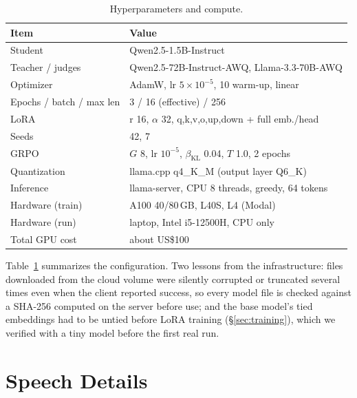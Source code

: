 \begin{table}[t]
\centering\footnotesize
\begin{tabular}{@{}lp{4.1cm}@{}}
\toprule
Item & Value \\
\midrule
Student & Qwen2.5-1.5B-Instruct \\
Teacher / judges & Qwen2.5-72B-Instruct-AWQ, Llama-3.3-70B-AWQ \\
Optimizer & AdamW, lr $5\times10^{-5}$, 10 warm-up, linear \\
Epochs / batch / max len & 3 / 16 (effective) / 256 \\
LoRA & r 16, $\alpha$ 32, q,k,v,o,up,down + full emb./head \\
Seeds & 42, 7 \\
GRPO & $G$ 8, lr $10^{-5}$, $\beta_{\text{KL}}$ 0.04, $T$ 1.0, 2 epochs \\
Quantization & llama.cpp q4\_K\_M (output layer Q6\_K) \\
Inference & llama-server, CPU 8 threads, greedy, 64 tokens \\
Hardware (train) & A100 40/80\,GB, L40S, L4 (Modal) \\
Hardware (run) & laptop, Intel i5-12500H, CPU only \\
Total GPU cost & about US\$100 \\
\bottomrule
\end{tabular}
\caption{Hyperparameters and compute.}
\label{tab:hyper}
\end{table}

Table~\ref{tab:hyper} summarizes the configuration. Two lessons from the infrastructure: files downloaded from the cloud volume
were silently corrupted or truncated several times even when the client reported success, so every model file is checked against
a SHA-256 computed on the server before use; and the base model's tied embeddings had to be untied before LoRA training
(\S\ref{sec:training}), which we verified with a tiny model before the first real run.

\section{Speech Details}
\label{app:speech}

